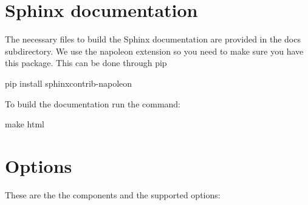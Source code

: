 \documentclass[]{article}
\begin{document}
\section{Sphinx documentation}
The necessary files to build the Sphinx documentation are provided in the docs subdirectory. 
We use the napoleon extension so you need to make sure you have this package. This can 
be done through pip
\begin{python}
pip install sphinxcontrib-napoleon
\end{python}
To build the documentation run the command:
\begin{python}
make html
\end{python}

\section{Options}
These are the the components and the supported options:
\end{document}
